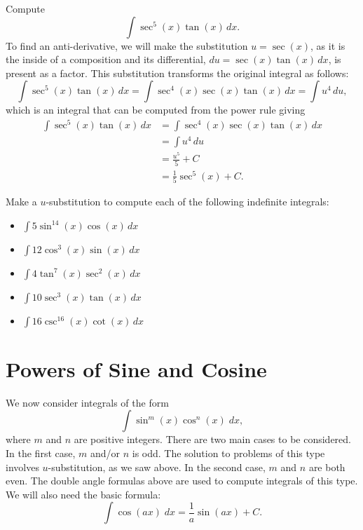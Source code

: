 \documentclass{ximera}
\begin{document}
\begin{example}
Compute
\[
\int \sec^5(x) \tan(x) \, dx.
\]
To find an anti-derivative, we will make the substitution $u = \sec(x)$, as it is the inside of a composition
and its differential, $du = \sec(x)\tan(x) \, dx$, is present as a factor. 
This substitution transforms the original integral as follows:
\[
\int \sec^5(x) \tan(x) \, dx = \int \sec^4(x) \sec(x) \tan(x) \, dx= \int u^4 \, du,
\]
which is an integral that can be computed from the power rule giving
\begin{align*}
\int \sec^5(x) \tan(x) \, dx &= \int \sec^4(x) \sec(x) \tan(x) \, dx\\
                             &= \int u^4 \, du\\
                             &= \frac{u^5}{5} + C\\
                             &= \frac15 \sec^5(x) + C.
\end{align*}

\end{example}

\begin{problem}
Make a $u$-substitution to compute each of the following indefinite integrals:
\begin{itemize}
\item $\displaystyle{\int 5\sin^{14}(x)\cos(x) \, dx}$
\item $\displaystyle{\int 12\cos^{3}(x)\sin(x) \, dx}$
\item $\displaystyle{\int 4\tan^{7}(x)\sec^2(x) \, dx}$
\item $\displaystyle{\int 10 \sec^{3}(x)\tan(x) \, dx}$
\item $\displaystyle{\int 16\csc^{16}(x)\cot(x) \, dx}$
\end{itemize}
\end{problem}

\section{Powers of Sine and Cosine}
We now consider integrals of the form 
\[
\int \sin^m(x) \cos^n(x) \; dx,
\]
where $m$ and $n$ are positive integers.
There are two main cases to be considered.
In the first case, $m$ and/or $n$ is odd.
The solution to problems of this type involves $u$-substitution,
as we saw above.
In the second case, $m$ and $n$ are both even. The double angle formulas above are used to 
compute integrals of this type. We will also need the basic formula:
\[
\int \cos(ax) \; dx = \frac{1}{a} \sin(ax) + C.
\]
\end{document}

